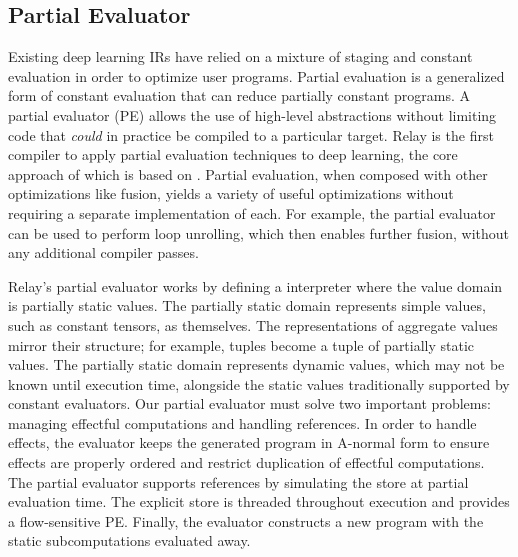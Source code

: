 \subsection{Partial Evaluator}
\label{sec:partial_eval}
Existing deep learning IRs have relied on
  a mixture of staging and constant evaluation
  in order to optimize user programs.
Partial evaluation is a generalized form of constant
  evaluation that can reduce partially constant
  programs.
A partial evaluator (PE) allows the use of high-level abstractions
  without limiting code that \textit{could} in practice be
  compiled to a particular target.
Relay is the first compiler to apply partial evaluation
  techniques to deep learning, the
  core approach of which is based on \citep{pe_ref}.
Partial evaluation, when composed with other
  optimizations like fusion, yields a variety
  of useful optimizations without requiring
  a separate implementation of each.
For example, the partial evaluator can be used to perform
  loop unrolling, which then enables further fusion,
  without any additional compiler passes.

Relay's partial evaluator works by defining a interpreter
  where the value domain is partially static values.
The partially static domain represents simple values,
  such as constant tensors, as themselves.
The representations
  of aggregate values mirror their structure; for example,
  tuples become a tuple of partially static values.
The partially static domain represents dynamic values,
  which may not be known until execution time,
  alongside the static values traditionally supported by
  constant evaluators.
Our partial evaluator must solve two important problems:
  managing effectful computations and handling references.
In order to handle effects, the evaluator keeps the generated
  program in A-normal form to ensure effects are properly ordered
  and restrict duplication of effectful computations.
The partial evaluator supports references by
  simulating the store at partial evaluation time.
The explicit store is threaded throughout execution
  and provides a flow-sensitive PE.
Finally, the evaluator constructs a new program with
  the static subcomputations evaluated away.

